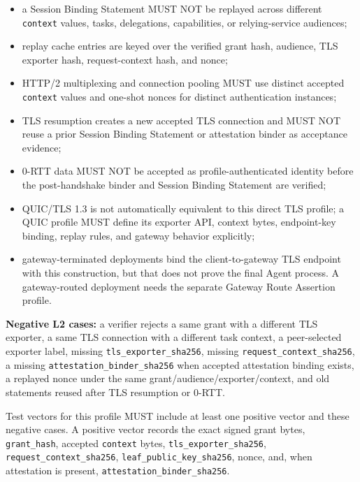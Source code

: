 \documentclass[
]{article}
\providecommand{\tightlist}{%
  \setlength{\itemsep}{0pt}\setlength{\parskip}{0pt}}
\begin{document}
\begin{itemize}
\tightlist
\item
  a Session Binding Statement MUST NOT be replayed across different
  \texttt{context} values, tasks, delegations, capabilities, or
  relying-service audiences;
\item
  replay cache entries are keyed over the verified grant hash, audience,
  TLS exporter hash, request-context hash, and nonce;
\item
  HTTP/2 multiplexing and connection pooling MUST use distinct accepted
  \texttt{context} values and one-shot nonces for distinct
  authentication instances;
\item
  TLS resumption creates a new accepted TLS connection and MUST NOT reuse
  a prior Session Binding Statement or attestation binder as acceptance
  evidence;
\item
  0-RTT data MUST NOT be accepted as profile-authenticated identity
  before the post-handshake binder and Session Binding Statement are
  verified;
\item
  QUIC/TLS 1.3 is not automatically equivalent to this direct TLS
  profile; a QUIC profile MUST define its exporter API, context bytes,
  endpoint-key binding, replay rules, and gateway behavior explicitly;
\item
  gateway-terminated deployments bind the client-to-gateway TLS endpoint
  with this construction, but that does not prove the final Agent
  process. A gateway-routed deployment needs the separate Gateway Route
  Assertion profile.
\end{itemize}

\textbf{Negative L2 cases:} a verifier rejects a same grant with a
different TLS exporter, a same TLS connection with a different task
context, a peer-selected exporter label, missing
\texttt{tls\_exporter\_sha256}, missing
\texttt{request\_context\_sha256}, a missing
\texttt{attestation\_binder\_sha256} when accepted attestation binding
exists, a replayed nonce under the same grant/audience/exporter/context,
and old statements reused after TLS resumption or 0-RTT.

Test vectors for this profile MUST include at least one positive vector
and these negative cases. A positive vector records the exact signed
grant bytes, \texttt{grant\_hash}, accepted \texttt{context} bytes,
\texttt{tls\_exporter\_sha256}, \texttt{request\_context\_sha256},
\texttt{leaf\_public\_key\_sha256}, nonce, and, when attestation is
present, \texttt{attestation\_binder\_sha256}.
\end{document}
